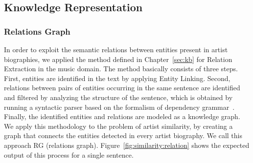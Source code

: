 
\subsection{Knowledge Representation}\label{sec:similarity:knowledge_representations}

\subsubsection{Relations Graph}\label{sec:similarity:rel_graph} %

In order to exploit the semantic relations between entities present in artist biographies, we applied the method defined in Chapter~\ref{sec:kb} for Relation Extraction in the music domain. The method basically consists of three steps. First, entities are identified in the text by applying Entity Linking. Second, relations between pairs of entities occurring in the same sentence are identified and filtered by analyzing the structure of the sentence, which is obtained by running a syntactic parser based on the formalism of dependency grammar~\citep{Bohnet2010}. Finally, the identified entities and relations are modeled as a knowledge graph.
We apply this methodology to the problem of artist similarity, by creating a graph that connects the entities detected in every artist biography. We call this approach RG (relations graph). Figure~\ref{fig:similarity:relation} shows the expected output of this process for a single sentence.

